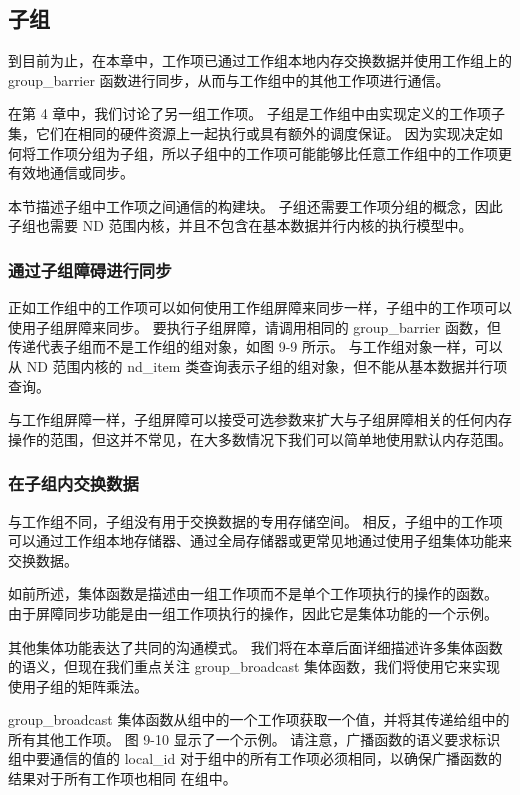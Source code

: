 \subsection{子组}
到目前为止，在本章中，工作项已通过工作组本地内存交换数据并使用工作组上的 group\_barrier 函数进行同步，从而与工作组中的其他工作项进行通信。

在第 4 章中，我们讨论了另一组工作项。 子组是工作组中由实现定义的工作项子集，它们在相同的硬件资源上一起执行或具有额外的调度保证。 因为实现决定如何将工作项分组为子组，所以子组中的工作项可能能够比任意工作组中的工作项更有效地通信或同步。

本节描述子组中工作项之间通信的构建块。 子组还需要工作项分组的概念，因此子组也需要 ND 范围内核，并且不包含在基本数据并行内核的执行模型中。

\subsubsection{通过子组障碍进行同步}
正如工作组中的工作项可以如何使用工作组屏障来同步一样，子组中的工作项可以使用子组屏障来同步。 要执行子组屏障，请调用相同的 group\_barrier 函数，但传递代表子组而不是工作组的组对象，如图 9-9 所示。 与工作组对象一样，可以从 ND 范围内核的 nd\_item 类查询表示子组的组对象，但不能从基本数据并行项查询。

与工作组屏障一样，子组屏障可以接受可选参数来扩大与子组屏障相关的任何内存操作的范围，但这并不常见，在大多数情况下我们可以简单地使用默认内存范围。

\subsubsection{在子组内交换数据}
与工作组不同，子组没有用于交换数据的专用存储空间。 相反，子组中的工作项可以通过工作组本地存储器、通过全局存储器或更常见地通过使用子组集体功能来交换数据。

如前所述，集体函数是描述由一组工作项而不是单个工作项执行的操作的函数。 由于屏障同步功能是由一组工作项执行的操作，因此它是集体功能的一个示例。

其他集体功能表达了共同的沟通模式。 我们将在本章后面详细描述许多集体函数的语义，但现在我们重点关注 group\_broadcast 集体函数，我们将使用它来实现使用子组的矩阵乘法。

group\_broadcast 集体函数从组中的一个工作项获取一个值，并将其传递给组中的所有其他工作项。 图 9-10 显示了一个示例。 请注意，广播函数的语义要求标识组中要通信的值的 local\_id 对于组中的所有工作项必须相同，以确保广播函数的结果对于所有工作项也相同 在组中。

